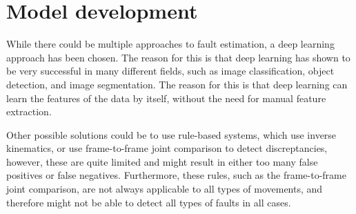 \chapter{Model development}
\label{sec:model_development}

While there could be multiple approaches to fault estimation, a deep learning approach has been chosen. The reason for this is that deep learning has shown to be very successful in many different fields, such as image classification, object detection, and image segmentation. The reason for this is that deep learning can learn the features of the data by itself, without the need for manual feature extraction.

Other possible solutions could be to use rule-based systems, which use inverse kinematics, or use frame-to-frame joint comparison to detect discreptancies, however, these are quite limited and might result in either too many false positives or false negatives. Furthermore, these rules, such as the frame-to-frame joint comparison, are not always applicable to all types of movements, and therefore might not be able to detect all types of faults in all cases.



